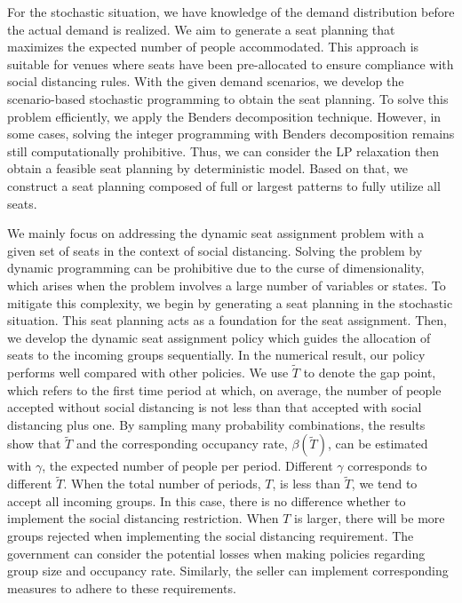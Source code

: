 For the stochastic situation, we have knowledge of the demand distribution before the actual demand is realized. We aim to generate a seat planning that maximizes the expected number of people accommodated. This approach is suitable for venues where seats have been pre-allocated to ensure compliance with social distancing rules. With the given demand scenarios, we develop the scenario-based stochastic programming to obtain the seat planning. To solve this problem efficiently, we apply the Benders decomposition technique. However, in some cases, solving the integer programming with Benders decomposition remains still computationally prohibitive. Thus, we can consider the LP relaxation then obtain a feasible seat planning by deterministic model. Based on that, we construct a seat planning composed of full or largest patterns to fully utilize all seats.

We mainly focus on addressing the dynamic seat assignment problem with a given set of seats in the context of social distancing. Solving the problem by dynamic programming can be prohibitive due to the curse of dimensionality, which arises when the problem involves a large number of variables or states. To mitigate this complexity, we begin by generating a seat planning in the stochastic situation. This seat planning acts as a foundation for the seat assignment. Then, we develop the dynamic seat assignment policy which guides the allocation of seats to the incoming groups sequentially. In the numerical result, our policy performs well compared with other policies. 
We use $\tilde{T}$ to denote the gap point, which refers to the first time period at which, on average, the number of people accepted without social distancing is not less than that accepted with social distancing plus one. By sampling many probability combinations, the results show that $\tilde{T}$ and the corresponding occupancy rate, $\beta(\tilde{T})$, can be estimated with $\gamma$, the expected number of people per period. Different $\gamma$ corresponds to different $\tilde{T}$. When the total number of periods, $T$, is less than $\tilde{T}$, we tend to accept all incoming groups. In this case, there is no difference whether to implement the social distancing restriction. When $T$ is larger, there will be more groups rejected when implementing the social distancing requirement. The government can consider the potential losses when making policies regarding group size and occupancy rate. Similarly, the seller can implement corresponding measures to adhere to these requirements.

